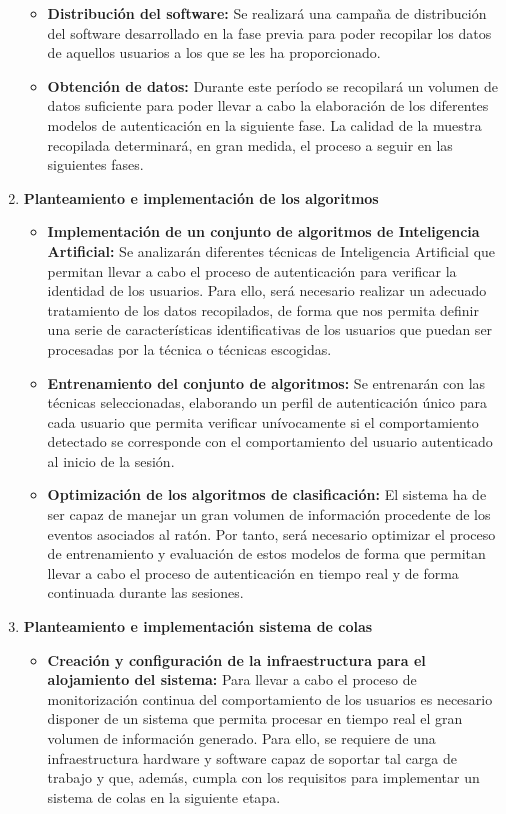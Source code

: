 \begin{enumerate}[noitemsep]
\begin{itemize}
        \item \textbf{Distribución del software:} Se realizará una campaña de distribución del software desarrollado en la fase previa para poder recopilar los datos de aquellos usuarios a los que se les ha proporcionado.
        \item \textbf{Obtención de datos:} Durante este período se recopilará un volumen de datos suficiente para poder llevar a cabo la elaboración de los diferentes modelos de autenticación en la siguiente fase. La calidad de la muestra recopilada determinará, en gran medida, el proceso a seguir en las siguientes fases.
    \end{itemize}
    \item \textbf{Planteamiento e implementación de los algoritmos}
    \begin{itemize}
        \item \textbf{Implementación de un conjunto de algoritmos de Inteligencia Artificial:} Se analizarán diferentes técnicas de Inteligencia Artificial que permitan llevar a cabo el proceso de autenticación para verificar la identidad de los usuarios. Para ello, será necesario realizar un adecuado tratamiento de los datos recopilados, de forma que nos permita definir una serie de características identificativas de los usuarios que puedan ser procesadas por la técnica o técnicas escogidas.
        \item \textbf{Entrenamiento del conjunto de algoritmos:} Se entrenarán con las técnicas seleccionadas, elaborando un perfil de autenticación único para cada usuario que permita verificar unívocamente si el comportamiento detectado se corresponde con el comportamiento del usuario autenticado al inicio de la sesión.
        \item \textbf{Optimización de los algoritmos de clasificación:} El sistema ha de ser capaz de manejar un gran volumen de información procedente de los eventos asociados al ratón. Por tanto, será necesario optimizar el proceso de entrenamiento y evaluación de estos modelos de forma que permitan llevar a cabo el proceso de autenticación en tiempo real y de forma continuada durante las sesiones.
    \end{itemize}
    \item \textbf{Planteamiento e implementación sistema de colas}
    \begin{itemize}
        \item \textbf{Creación y configuración de la infraestructura para el alojamiento del sistema:} Para llevar a cabo el proceso de monitorización continua del comportamiento de los usuarios es necesario disponer de un sistema que permita procesar en tiempo real el gran volumen de información generado. Para ello, se requiere de una infraestructura hardware y software capaz de soportar tal carga de trabajo y que, además, cumpla con los requisitos para implementar un sistema de colas en la siguiente etapa.

\end{itemize}
\end{enumerate}
